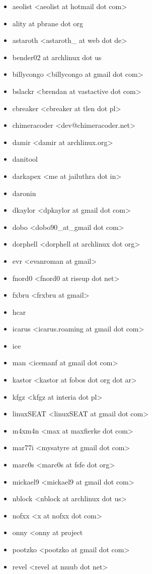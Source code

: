 \begin{itemize}
\item  aeolist <aeolist at hotmail dot com>
\item  ality at pbrane dot org
\item  astaroth <astaroth\_ at web dot de>
\item  bender02 at archlinux dot us
\item  billycongo <billycongo at gmail dot com>
\item  bslackr <brendan at vastactive dot com>
\item  cbreaker <cbreaker at tlen dot pl>
\item  chimeracoder <dev@chimeracoder.net>
\item  damir <damir at archlinux.org>
\item  danitool
\item  darkapex <me at jailuthra dot in>
\item  daronin
\item  dkaylor <dpkaylor at gmail dot com>
\item  dobo <dobo90\_at\_gmail dot com>
\item  dorphell <dorphell at archlinux dot org>
\item  evr <evanroman  at  gmail>
\item  fnord0 <fnord0 at riseup dot net>
\item  fxbru <frxbru at gmail>
\item  hcar
\item  icarus <icarus.roaming at gmail dot com>
\item  ice\item man <icemanf at gmail dot com>
\item  kastor <kastor at fobos dot org dot ar>
\item  kfgz <kfgz at interia dot pl>
\item  linuxSEAT <linuxSEAT at gmail dot com>
\item  m4xm4n <max at maxfierke dot com>
\item  mar77i <mysatyre at gmail dot com>
\item  marc0s <marc0s at fsfe dot org>
\item  mickael9 <mickael9 at gmail dot com>
\item  nblock <nblock at archlinux dot us>
\item  nofxx <x at nofxx dot com>
\item  onny <onny at project
\item  pootzko <pootzko at gmail dot com>
\item  revel <revel at muub dot net>

\end{itemize}
